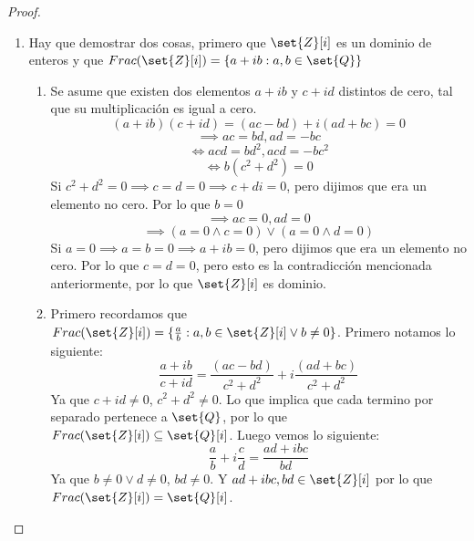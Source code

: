 \documentclass[11pt]{article}
\begin{document}
\begin{enumerate}
        \begin{proof}
            \
            \begin{enumerate}[label=(\alph*)]
                \item Hay que demostrar dos cosas, primero que $\set{Z}[i]$ es un dominio de enteros y que $Frac(\set{Z}[i])=\{a+ib:a,b\in\set{Q}\}$
                \begin{enumerate}
                    \item Se asume que existen dos elementos $a+ib$ y $c+id$ distintos de cero, tal que su multiplicación es igual a cero.
                    \[(a+ib)(c+id)=(ac-bd)+i(ad+bc)=0\]
                    \[\implies ac=bd, ad=-bc\]
                    \[\iff acd=bd^2,acd=-bc^2\]
                    \[\iff b(c^2+d^2)=0\]
                    Si $c^2+d^2=0\implies c=d=0\implies c+di=0$, pero dijimos que era un elemento no cero. Por lo que $b=0$
                    \[\implies ac=0,ad=0\]
                    \[\implies (a=0\wedge c=0)\vee(a=0\wedge d=0)\]
                    Si $a=0\implies a=b=0\implies a+ib=0$, pero dijimos que era un elemento no cero. Por lo que $c=d=0$, pero esto es la contradicción mencionada anteriormente, por lo que $\set{Z}[i]$ es dominio.

                    \item Primero recordamos que $Frac(\set{Z}[i])=\{\frac{a}{b}:a,b\in\set{Z}[i]\vee b\neq 0\}$. Primero notamos lo siguiente:
                    \[\frac{a+ib}{c+id}=\frac{(ac-bd)}{c^2+d^2}+i\frac{(ad+bc)}{c^2+d^2}\]
                    Ya que $c+id\neq 0$, $c^2+d^2\neq 0$. Lo que implica que cada termino por separado pertenece a $\set{Q}$, por lo que $Frac(\set{Z}[i])\subseteq\set{Q}[i]$. Luego vemos lo siguiente:
                    \[\frac{a}{b}+i\frac{c}{d}=\frac{ad+ibc}{bd}\]
                    Ya que $b\neq 0\vee d\neq0$, $bd\neq 0$. Y $ad+ibc,bd\in\set{Z}[i]$ por lo que $Frac(\set{Z}[i])=\set{Q}[i]$.
                \end{enumerate}


\end{enumerate}
\end{proof}
\end{enumerate}
\end{document}
